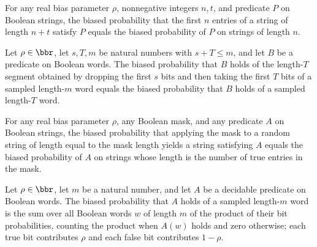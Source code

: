 \begin{theorem}
\label{Randomized.biasedProb_take}
\leanok
{}
For any real bias parameter $\rho$, nonnegative integers $n,t$, and predicate $P$ on
Boolean strings, the biased probability that the first $n$ entries of a string of length
$n+t$ satisfy $P$ equals the biased probability of $P$ on strings of length $n$.
\end{theorem}

\begin{theorem}
\label{Randomized.biasedProb_drop_take}
\leanok
{}
Let $\rho\in\bbr$, let $s,T,m$ be natural numbers with $s+T\le m$, and let $B$ be a
predicate on Boolean words. The biased probability that $B$ holds of the length-$T$
segment obtained by dropping the first $s$ bits and then taking the first $T$ bits of a
sampled length-$m$ word equals the biased probability that $B$ holds of a sampled
length-$T$ word.
\end{theorem}

\begin{theorem}
\label{Randomized.biasedProb_maskSelect}
\leanok
{}
For any real bias parameter $\rho$, any Boolean mask, and any predicate $A$ on Boolean
strings, the biased probability that applying the mask to a random string of length
equal to the mask length yields a string satisfying $A$ equals the biased probability of
$A$ on strings whose length is the number of true entries in the mask.
\end{theorem}

\begin{theorem}
\label{Randomized.biasedProb_eq_sum}
\leanok
{}
Let $\rho\in\bbr$, let $m$ be a natural number, and let $A$ be a decidable predicate on
Boolean words. The biased probability that $A$ holds of a sampled length-$m$ word is the
sum over all Boolean words $w$ of length $m$ of the product of their bit probabilities,
counting the product when $A(w)$ holds and zero otherwise; each true bit contributes
$\rho$ and each false bit contributes $1-\rho$.
\end{theorem}

